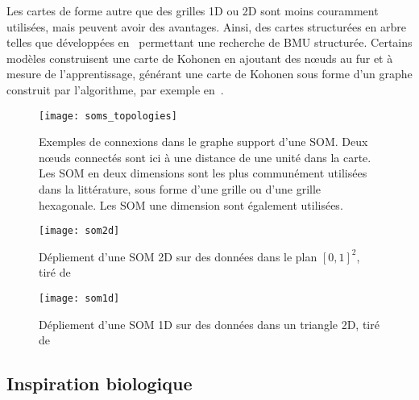 \documentclass[../main]{subfiles}
\begin{document}
Les cartes de forme autre que des grilles 1D ou 2D sont moins couramment utilisées, mais peuvent avoir des avantages. Ainsi, des cartes structurées en arbre telles que développées en~\cite{koikkalainen_self-organizing_1990} permettant une recherche de BMU structurée. Certains modèles construisent une carte de Kohonen en ajoutant des n\oe{}uds au fur et à mesure de l'apprentissage, générant une carte de Kohonen sous forme d'un graphe construit par l'algorithme, par exemple en~\cite{alahakoon_dynamic_2000, yamaguchi_adaptive_2010}.

\begin{figure}
\centering
\texttt{[image: soms\_topologies]}
\caption{Exemples de connexions dans le graphe support d'une SOM. Deux n\oe{}uds connectés sont ici à une distance de une unité dans la carte.
Les SOM en deux dimensions sont les plus communément utilisées dans la littérature, sous forme d'une grille ou d'une grille hexagonale. Les SOM une dimension sont également utilisées. \label{fig:topo}}

\end{figure}

\begin{figure}
\centering
\texttt{[image: som2d]}
\caption{Dépliement d'une SOM 2D sur des données dans le plan $[0,1]^2$, tiré de~\cite{Kohonen1995SelfOrganizingM} \label{fig:som2d}}

\end{figure}

\begin{figure}
\centering
\texttt{[image: som1d]}
\caption{Dépliement d'une SOM 1D sur des données dans un triangle 2D, tiré de~\cite{Kohonen1995SelfOrganizingM}\label{fig:som1d}}

\end{figure}


\subsection{Inspiration biologique}
\end{document}
